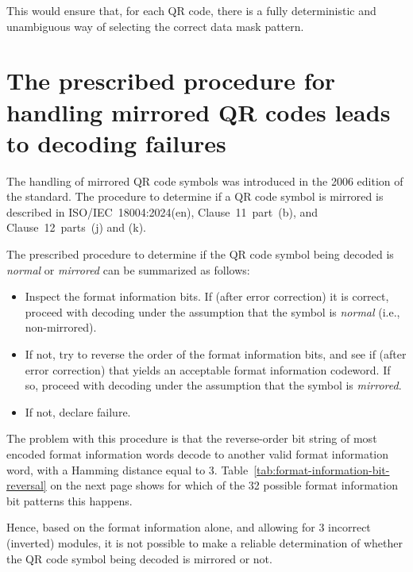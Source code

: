 \documentclass[a4paper,twoside]{article}
\newcommand{\shortstandard}{ISO/IEC~18004}
\newcommand{\standard}{\shortstandard:2024(en)}
\begin{document}
This would ensure that, for each QR code, there is a fully deterministic and unambiguous way of selecting the correct data mask pattern.

\section{The prescribed procedure for handling mirrored QR codes leads to decoding failures}
\label{sec:mirrored-symbol-issue}


The handling of mirrored QR code symbols was introduced in the 2006 edition of the standard. The procedure to determine if a QR code symbol
is mirrored is described in \standard, Clause~11~part~(b), and Clause~12~parts~(j) and (k).

The prescribed procedure to determine if the QR code symbol being decoded is \emph{normal} or \emph{mirrored} can be summarized as follows:

\begin{itemize}
\item Inspect the format information bits. If (after error correction) it is correct, proceed with decoding under the assumption that the symbol
      is \emph{normal} (i.e., non-mirrored).
\item If not, try to reverse the order of the format information bits, and see if (after error correction) that yields an acceptable format information
      codeword. If so, proceed with decoding under the assumption that the symbol is \emph{mirrored}.
\item If not, declare failure. 
\end{itemize}

The problem with this procedure is that the reverse-order bit string of most encoded format information words decode to another valid format information word, with a Hamming
distance equal to 3. Table~\ref{tab:format-information-bit-reversal} on the next page shows for which of the 32 possible format information bit patterns this happens.

Hence, based on the format information alone, and allowing for 3 incorrect (inverted) modules, it is not possible to make a reliable determination of
whether the QR code symbol being decoded is mirrored or not.
\end{document}
